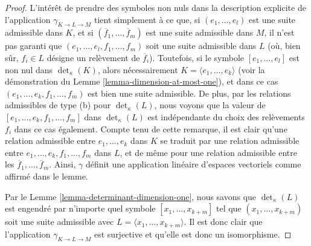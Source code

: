 \begin{proof}
L'intérêt de prendre des symboles non nuls dans la description explicite
de l'application $\gamma_{K \to L \to M}$ tient simplement à ce que, si $(e_1, \ldots, e_l)$
est une suite admissible dans $K$, et si
$(\overline{f}_1, \ldots, \overline{f}_m)$ est une suite admissible dans
$M$, il n'est pas garanti que $(e_1, \ldots, e_l, f_1, \ldots, f_m)$
soit une suite admissible dans $L$ (où, bien sûr, $f_i \in L$ désigne
un relèvement de $\overline{f}_i$). Toutefois, si le symbole
$[e_1, \ldots, e_l]$ est non nul dans $\det_\kappa(K)$, alors
nécessairement $K = \langle e_1, \ldots, e_k\rangle$ (voir la
démonstration du Lemme \ref{lemma-dimension-at-most-one}), et
dans ce cas $(e_1, \ldots, e_k, f_1, \ldots, f_m)$ est bien
une suite admissible.
De plus, par les relations admissibles de type (b) pour $\det_\kappa(L)$,
nous voyons que la valeur de $[e_1, \ldots, e_k, f_1, \ldots, f_m]$ dans
$\det_\kappa(L)$ est indépendante du choix des relèvements
$f_i$ dans ce cas également. Compte tenu de cette remarque, il est clair
qu'une relation admissible entre $e_1, \ldots, e_k$ dans $K$
se traduit par une relation admissible entre
$e_1, \ldots, e_k, f_1, \ldots, f_m$ dans $L$, et
de même pour une relation admissible entre les
$\overline{f}_1, \ldots, \overline{f}_m$.
Ainsi, $\gamma$ définit une application linéaire d'espaces vectoriels comme affirmé dans le lemme.

\medskip\noindent
Par le Lemme \ref{lemma-determinant-dimension-one}, nous savons que
$\det_\kappa(L)$ est engendré par n'importe quel
symbole $[x_1, \ldots, x_{k + m}]$ tel que
$(x_1, \ldots, x_{k + m})$ soit une suite admissible
avec $L = \langle x_1, \ldots, x_{k + m}\rangle$. Il est donc
clair que l'application $\gamma_{K \to L \to M}$ est surjective et
qu'elle est donc un isomorphisme.


\end{proof}
